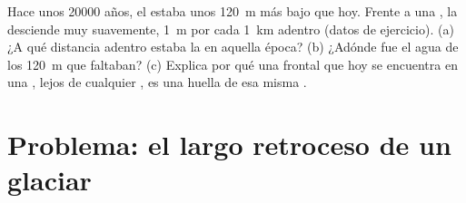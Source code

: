 \begin{exercise}[$\star\star\star$]\label{exo:g8:ice-on-earth:12}
Hace unos \num{20000} años, el  estaba unos \qty{120}{m} más bajo que
hoy. Frente a una , la  desciende muy
suavemente, \qty{1}{m} por cada \qty{1}{km}  adentro (datos de
ejercicio). (a) ¿A qué distancia  adentro estaba la  en aquella
época? (b) ¿Adónde fue el agua de los \qty{120}{m} que faltaban?
(c) Explica por qué una  frontal que hoy se encuentra en una
, lejos de cualquier , es una huella de esa misma .
\end{exercise}

\section{Problema: el largo retroceso de un glaciar}

